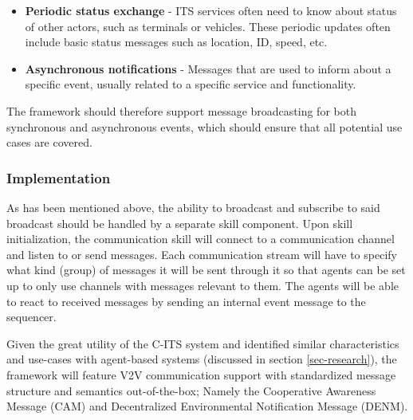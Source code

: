 \documentclass[main.tex]{subfiles}
\begin{document}
\begin{itemize}
    \item \textbf{Periodic status exchange} - ITS services often need to know about 
    status of other actors, such as terminals or vehicles. These periodic updates 
    often include basic status messages such as location, ID, speed, etc.
    \item \textbf{Asynchronous notifications} - Messages that are used to inform 
    about a specific event, usually related to a specific service and functionality.
\end{itemize}



The framework should therefore support message broadcasting for both synchronous and 
asynchronous events, which should ensure that all potential use cases are covered. 

\subsubsection{Implementation}

As has been mentioned above, the ability to broadcast and subscribe to said broadcast should be
handled by a separate skill component. Upon skill initialization, the communication skill will
connect to a communication channel and listen to or send messages. Each communication stream will have 
to specify what kind (group) of messages it will be sent through it so that agents can be set up to 
only use channels with messages relevant to them. The agents will be able to react to received
messages by sending an internal event message to the sequencer. 

Given the great utility of the C-ITS system and identified similar characteristics and use-cases 
with agent-based systems (discussed in section \ref{sec-research}), the framework will feature 
V2V communication support with standardized message structure and semantics out-of-the-box; 
Namely the Cooperative Awareness Message (CAM) and Decentralized Environmental Notification Message (DENM).
\end{document}
